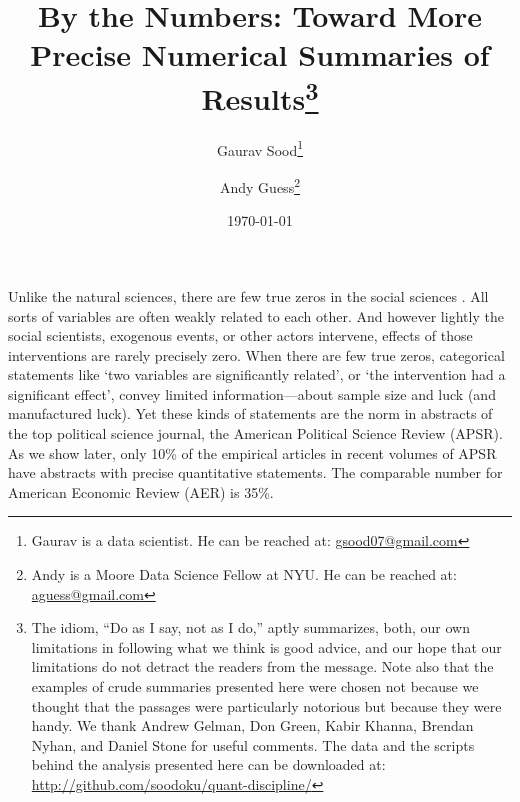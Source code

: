 \documentclass[12pt]{article}
\begin{document}
\title{\vspace{-.5cm}\normalsize{\textbf{By the Numbers: Toward More Precise Numerical Summaries of Results}}\footnote{The idiom, ``Do as I say, not as I do,'' aptly summarizes, both, our own limitations in following what we think is good advice, and our hope that our limitations do not detract the readers from the message. Note also that the examples of crude summaries presented here were chosen not because we thought that the passages were particularly notorious but because they were handy. We thank Andrew Gelman, Don Green, Kabir Khanna, Brendan Nyhan, and Daniel Stone for useful comments. The data and the scripts behind the analysis presented here can be downloaded at: \url{http://github.com/soodoku/quant-discipline/}}\vspace{.5cm}}
\author{\normalsize{Gaurav Sood}\footnote{Gaurav is a data scientist. He can be reached at: \href{mailto:gsood07@gmail.com}{\small{gsood07@gmail.com}}} \and \normalsize{Andy Guess}\footnote{Andy is a Moore Data Science Fellow at NYU. He can be reached at: \href{mailto:aguess@gmail.com}{\small{aguess@gmail.com}}}}
\date{\vspace{.5cm}\normalsize{\today}}
\maketitle
\doublespacing

\clearpage
Unlike the natural sciences, there are few true zeros in the social sciences \citep[p. 960,][]{gelman2011causality}. All sorts of variables are often weakly related to each other. And however lightly the social scientists, exogenous events, or other actors intervene, effects of those interventions are rarely precisely zero. When there are few true zeros, categorical statements like `two variables are significantly related', or `the intervention had a significant effect', convey limited information---about sample size and luck (and manufactured luck). Yet these kinds of statements are the norm in abstracts of the top political science journal, the American Political Science Review (APSR).  As we show later, only 10\% of the empirical articles in recent volumes of APSR have abstracts with precise quantitative statements. The comparable number for American Economic Review (AER) is 35\%.
\end{document}
